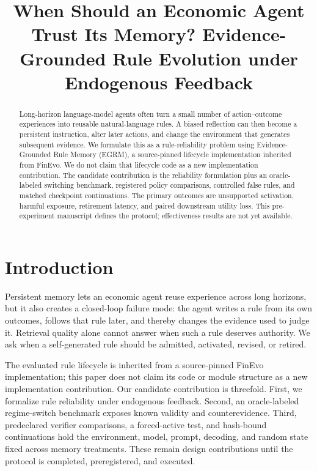 \documentclass[sigconf,anonymous,review]{acmart}
\title{When Should an Economic Agent Trust Its Memory? Evidence-Grounded Rule
Evolution under Endogenous Feedback}
\begin{document}
\begin{abstract}
Long-horizon language-model agents often turn a small number of action--outcome
experiences into reusable natural-language rules. A biased reflection can then
become a persistent instruction, alter later actions, and change the environment
that generates subsequent evidence. We formulate this as a rule-reliability
problem using Evidence-Grounded Rule Memory (EGRM), a source-pinned lifecycle
implementation inherited from FinEvo. We do not claim that lifecycle code as a
new implementation contribution. The candidate contribution is the reliability
formulation plus an oracle-labeled switching benchmark, registered policy
comparisons, controlled false rules, and matched checkpoint continuations. The
primary outcomes are unsupported activation, harmful exposure, retirement
latency, and paired downstream utility loss. This pre-experiment manuscript
defines the protocol; effectiveness results are not yet available.
\end{abstract}

\maketitle

\section{Introduction}
Persistent memory lets an economic agent reuse experience across long horizons,
but it also creates a closed-loop failure mode: the agent writes a rule from its
own outcomes, follows that rule later, and thereby changes the evidence used to
judge it. Retrieval quality alone cannot answer when such a rule deserves
authority. We ask when a self-generated rule should be admitted, activated,
revised, or retired.

The evaluated rule lifecycle is inherited from a source-pinned FinEvo
implementation; this paper does not claim its code or module structure as a new
implementation contribution. Our candidate contribution is threefold. First,
we formalize rule reliability under endogenous feedback. Second, an
oracle-labeled regime-switch benchmark exposes known validity and
counterevidence. Third, predeclared verifier comparisons, a forced-active test,
and hash-bound continuations hold the environment, model, prompt, decoding, and
random state fixed across memory treatments. These
remain design contributions until the protocol is completed, preregistered, and
executed.
\end{document}
